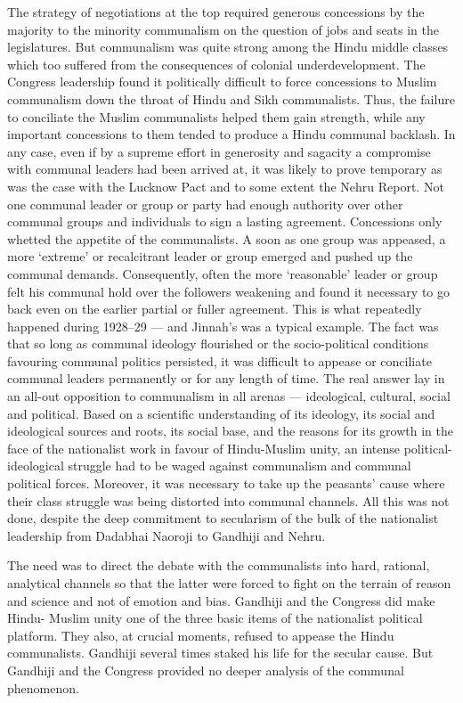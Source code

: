 The strategy of negotiations at the top required generous concessions by the majority to the minority communalism on the question of jobs and seats in the legislatures. But communalism was quite strong among the Hindu middle classes which too suffered from the consequences of colonial underdevelopment. The Congress leadership found it politically difficult to force concessions to Muslim communalism down the throat of Hindu and Sikh communalists. Thus, the failure to conciliate the Muslim communalists helped them gain strength, while any important concessions to them tended to produce a Hindu communal backlash. In any case, even if by a supreme effort in generosity and sagacity a compromise with communal leaders had been arrived at, it was likely to prove temporary as was the case with the Lucknow Pact and to some extent the Nehru Report. Not one communal leader or group or party had enough authority over other communal groups and individuals to sign a lasting agreement. Concessions only whetted the appetite of the communalists. A soon as one group was appeased, a more `extreme' or recalcitrant leader or group emerged and pushed up the communal demands. Consequently, often the more `reasonable' leader or group felt his communal hold over the followers weakening and found it necessary to go back even on the earlier partial or fuller agreement. This is what repeatedly happened during 1928--29 --- and Jinnah's was a typical example. The fact was that so long as communal ideology flourished or the socio-political conditions favouring communal politics persisted, it was difficult to appease or conciliate communal leaders permanently or for any length of time. The real answer lay in an all-out opposition to communalism in all arenas --- ideological, cultural, social and political. Based on a scientific understanding of its ideology, its social and ideological sources and roots, its social base, and the reasons for its growth in the face of the nationalist work in favour of Hindu-Muslim unity, an intense political-ideological struggle had to be waged against communalism and communal political forces. Moreover, it was necessary to take up the peasants' cause where their class struggle was being distorted into communal channels. All this was not done, despite the deep commitment to secularism of the bulk of the nationalist leadership from Dadabhai Naoroji to Gandhiji and Nehru. 

The need was to direct the debate with the communalists into hard, rational, analytical channels so that the latter were forced to fight on the terrain of reason and science and not of emotion and bias. Gandhiji and the Congress did make Hindu- Muslim unity one of the three basic items of the nationalist political platform. They also, at crucial moments, refused to appease the Hindu communalists. Gandhiji several times staked his life for the secular cause. But Gandhiji and the Congress provided no deeper analysis of the communal phenomenon. 

